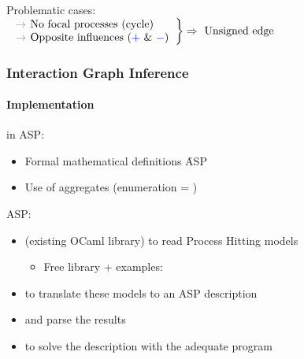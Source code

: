 \begin{frame}
\smallskip
Problematic cases:\\
\smallskip
$\left.\text{\begin{tabular}{l}
  \f No focal processes (cycle)\\
  \f Opposite influences (\ex{$+$} \& \ex{$-$})
 \end{tabular}}\right\} \Rightarrow \text{ Unsigned edge}$
\end{frame}



\begin{frame}[c]
  \frametitle{Interaction Graph Inference}
  \framesubtitle{Implementation}

 in ASP:
\begin{itemize}
  \item Formal mathematical definitions \f ASP
  \item Use of aggregates (enumeration = )
\end{itemize}

\bigskip
\pause

 ASP:
\begin{itemize}
  \item {} (existing OCaml library) to read Process Hitting models
  \begin{itemize}
    \item[] Free library + examples: 
  \end{itemize}
  \item {} to translate these models to an ASP description
  \item[] \quad and parse the results
  \item {} to solve the description with the adequate program
\end{itemize}

\end{frame}



